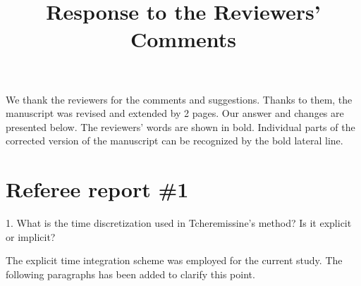 \documentclass{article}
\title{Response to the Reviewers' Comments}
\begin{document}
\maketitle

We thank the reviewers for the comments and suggestions.
Thanks to them, the manuscript was revised and extended by 2 pages.
Our answer and changes are presented below.
The reviewers' words are shown in bold.
Individual parts of the corrected version of the manuscript
can be recognized by the bold lateral line.

\section*{Referee report \#1}

\begin{quoting}
    1. What is the time discretization used in Tcheremissine's method? Is it explicit or implicit?
\end{quoting}

The explicit time integration scheme was employed for the current study.
The following paragraphs has been added to clarify this point.
\end{document}
